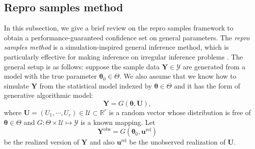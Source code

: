 \documentclass[11pt, reqno]{amsart}
\newcommand{\R}{\mathbb{R}}
\newcommand{\mY}{\mathcal{Y}}
\newcommand{\1}{\mbox{1}\hspace{-0.25em}\mbox{l}}
\theoremstyle{definition}\newtheorem{problem}{Problem}[section]
\theoremstyle{definition}\newtheorem{definition}[problem]{Definition}
\theoremstyle{remark}\newtheorem{assumption}{Assumption}
\theoremstyle{remark}\newtheorem{remark}[problem]{Remark}
\theoremstyle{definition}\newtheorem{example}[problem]{Example}
\theoremstyle{plain}\newtheorem{theorem}[problem]{Theorem}
\theoremstyle{plain}\newtheorem{question}[problem]{Question}
\theoremstyle{plain}\newtheorem{lemma}[problem]{Lemma}
\theoremstyle{plain}\newtheorem{proposition}[problem]{Proposition}
\theoremstyle{plain}\newtheorem{corollary}[problem]{Corollary}
\theoremstyle{plain}\newtheorem{conjecture}[problem]{Conjecture}
\begin{document}
\subsection{Repro samples method}
In this subsection, we give a brief review on the repro samples framework to obtain a performance-guaranteed confidence set on general parameters. The \textit{repro samples method} \cite{xie2022repro, xie2024repro} is a simulation-inspired general inference method, which is particularly effective for making inference on irregular inference problems \cite{wasserman2020universal}. The general setup is as follows: suppose the sample data $\bm{Y} \in \mathcal{Y}$ are generated from a model with the true parameter $\bm{\theta}_{0} \in \Theta$. We also assume that we know how to simulate $\bm{Y}$ from the statistical model indexed by $\bm{\theta} \in \Theta$ and it has the form of generative algorithmic model: 
\begin{equation}\label{eq:algorithmic}
    \bm{Y} = G(\bm{\theta}, \bm{U}),
\end{equation}
where $\bm{U} = (U_1, \cdots, U_r) \in \mathcal{U} \subset \R^r$ is a random vector whose distribution is free of $\bm{\theta} \in \Theta$ and $G: \Theta \times \mathcal{U} \mapsto \mY$ is a known mapping. Let 
\begin{equation}\label{eq:realization}
    \bm{Y}^{\mathrm{obs}} = G(\bm{\theta}_{0}, \bm{u}^{\mathrm{rel}})
\end{equation}
be the realized version of $\bm{Y}$ and also $\bm{u}^{\mathrm{rel}}$ be the unobserved realization of $\bm{U}$.
\end{document}
